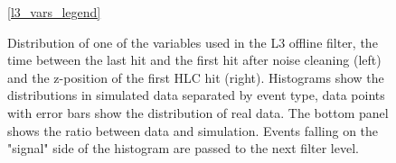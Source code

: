 \begin{figure}
    \centering
    \ref{l3_vars_legend}\par
    
    

    \caption{Distribution of one of the variables used in the L3 offline filter, the time between the last hit and the first hit after noise cleaning (left) and the z-position of the first HLC hit (right). Histograms show the distributions in simulated data separated by event type, data points with error bars show the distribution of real data. The bottom panel shows the ratio between data and simulation. Events falling on the "signal" side of the histogram are passed to the next filter level.}
    \label{fig:l3-cut-vars}
\end{figure}

